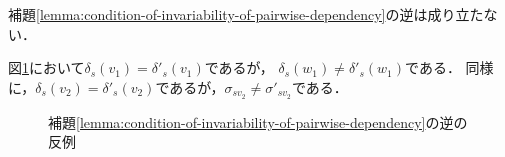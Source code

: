 補題\ref{lemma:condition-of-invariability-of-pairwise-dependency}の逆は成り立たない．

\begin{example}
  \label{ex:counter-of-invariability-of-pairwise-dependency}
  図\ref{fig:pd-invariability-counterexample}において$\delta_s(v_1)=\delta'_s(v_1)$であるが，
  $\delta_s(w_1)\neq\delta'_s(w_1)$である．
  同様に，$\delta_s(v_2)=\delta'_s(v_2)$であるが，$\sigma_{sv_2}\neq\sigma'_{sv_2}$である．

  \begin{figure}[tb]
    \centering
    \def\svgwidth{.45\linewidth}
    
    \caption{補題\ref{lemma:condition-of-invariability-of-pairwise-dependency}の逆の反例}
    \label{fig:pd-invariability-counterexample}
  \end{figure}
\end{example}

